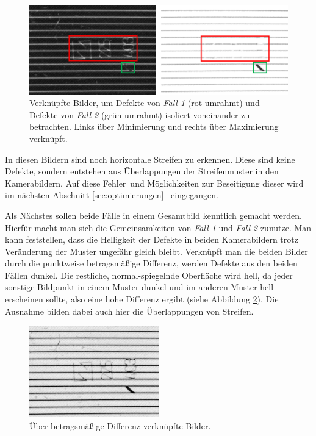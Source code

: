 \begin{figure}[H]
	\centering
	\includegraphics[width=\textwidth]{03_sichtpruefungDurchLichtstreuung/einsatzVonMehrerenStreifenmustern/figures/minAndMaxLink}
	\caption[Verknüpfte Bilder über Minimierung und Maximierung]{Verknüpfte Bilder, um Defekte von \textit{Fall 1} (rot umrahmt) und Defekte von \textit{Fall 2} (grün umrahmt) isoliert voneinander zu betrachten. Links über Minimierung und rechts über Maximierung verknüpft.}
	\label{img:minAndMaxLink}
\end{figure}

\noindent
In diesen Bildern sind noch horizontale Streifen zu erkennen.
Diese sind keine Defekte, sondern entstehen aus Überlappungen der Streifenmuster in den Kamerabildern.
Auf diese \glqq Fehler\grqq ~und Möglichkeiten zur Beseitigung dieser wird im nächsten Abschnitt \ref{sec:optimierungen} ~eingegangen.

\p
Als Nächstes sollen beide Fälle in einem Gesamtbild kenntlich gemacht werden.
Hierfür macht man sich die Gemeinsamkeiten von \textit{Fall 1} und \textit{Fall 2} zunutze.
Man kann feststellen, dass die Helligkeit der Defekte in beiden Kamerabildern trotz Veränderung der Muster ungefähr gleich bleibt.
Verknüpft man die beiden Bilder durch die punktweise betragsmäßige Differenz, werden Defekte aus den beiden Fällen dunkel.
Die restliche, normal-spiegelnde Oberfläche wird hell, da jeder sonstige Bildpunkt in einem Muster dunkel und im anderen Muster hell erscheinen sollte, also eine hohe Differenz ergibt (siehe Abbildung \ref{img:diffImage}).
Die Ausnahme bilden dabei auch hier die Überlappungen von Streifen.

\begin{figure}[H]
	\centering
	\includegraphics[width=0.5\textwidth]{03_sichtpruefungDurchLichtstreuung/einsatzVonMehrerenStreifenmustern/figures/diffImage}
	\caption[Verknüpfte Bilder über Differenz]{Über betragsmäßige Differenz verknüpfte Bilder.}
	\label{img:diffImage}
\end{figure}